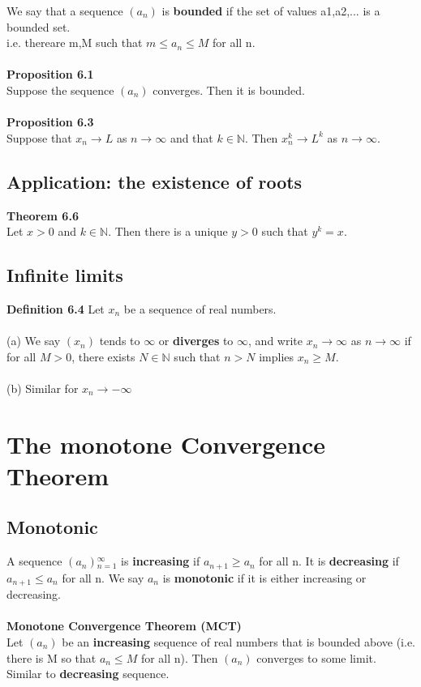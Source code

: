 \documentclass{article}
\theoremstyle{definition}
\theoremstyle{definition}
\theoremstyle{remark}
\begin{document}
We say that a sequence $(a_{n})$ is \textbf{bounded} if the set of values {a1,a2,...} is a bounded set. 
\\i.e. thereare m,M such that $m \leq a_{n} \leq M$ for all n.\\
\\
\textbf{Proposition 6.1}\\
Suppose the sequence $(a_{n})$ converges. Then it is bounded.\\
\\
\textbf{Proposition 6.3}\\
Suppose that $x_{n} \rightarrow L$ as $n \rightarrow \infty$ and that $k \in \mathbb{N}$. Then $x{_{n}^{k}} \rightarrow L^{k}$ as $n \rightarrow \infty$.\\




\subsection {Application: the existence of roots}
\textbf{Theorem 6.6}\\
Let $x>0$ and $k \in \mathbb{N}$. Then there is a unique $y>0$ such that $y^{k}=x$.\\

\subsection {Infinite limits}
\textbf{Definition 6.4}
Let ${x_{n}}$ be a sequence of real numbers.\\
\\
(a) We say $(x_{n})$ tends to $\infty$ or \textbf{diverges} to $\infty$, and write $x_{n}\rightarrow \infty$ as $n \rightarrow \infty$ if for all $M > 0$, there exists $N \in \mathbb{N}$ such that $n>N$ implies $x_{n}\geq M$.\\
\\
(b) Similar for $x_{n} \rightarrow -\infty$
\pagebreak


\section{The monotone Convergence Theorem}
\subsection{Monotonic}
A sequence $(a_{n}){_{n=1}^{\infty}}$ is \textbf{increasing} if $a_{n+1} \geq a_{n} $ for all n. It is \textbf{decreasing} if $a_{n+1}\leq a_{n}$ for all n. We say ${a_n}$ is \textbf{monotonic} if it is either increasing or decreasing. \\
\\
\textbf{Monotone Convergence Theorem (MCT)}\\
Let $(a_{n})$ be an \textbf{increasing} sequence of real numbers that is bounded above (i.e. there is M so that $a_{n}\leq M$ for all n). Then $(a_{n})$ converges to some limit.\\
Similar to \textbf{decreasing} sequence. \\
\end{document}
